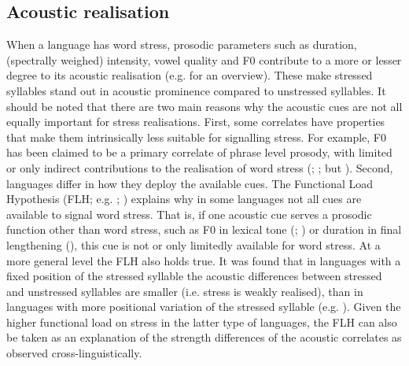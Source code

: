 \subsection{Acoustic realisation} \label{sec511}
When a language has word stress, prosodic parameters such as duration, (spectrally weighed) intensity, vowel quality and F0 contribute to a more or lesser degree to its acoustic realisation (e.g. \citealt{vanheuven_acoustic_2018} for an overview). These make stressed syllables stand out in acoustic prominence compared to unstressed syllables. It should be noted that there are two main reasons why the acoustic cues are not all equally important for stress realisations. First, some correlates have properties that make them intrinsically less suitable for signalling stress. For example, F0 has been claimed to be a primary correlate of phrase level prosody, with limited or only indirect contributions to the realisation of word stress (\citealt{gordon_disentangling_2014}; \citealt{gordon_acoustic_2017}; but \citealt{vogel_prominence_2016}). Second, languages differ in how they deploy the available cues. The Functional Load Hypothesis (FLH; e.g. \citealt{hockett_manual_1955}; \citealt{berinstein_cross-linguistic_1979}) explains why in some languages not all cues are available to signal word stress. That is, if one acoustic cue serves a prosodic function other than word stress, such as F0 in lexical tone (\citealt{potisuk_acoustic_1996}; \citealt{remijsen_lexically_2002}) or duration in final lengthening (\citealt{mcdonnell_acoustic_2016}), this cue is not or only limitedly available for word stress. At a more general level the FLH also holds true. It was found that in languages with a fixed position of the stressed syllable the acoustic differences between stressed and unstressed syllables are smaller (i.e. stress is weakly realised), than in languages with more positional variation of the stressed syllable (e.g. \citealt{dogil_phonetic_1999}). Given the higher functional load on stress in the latter type of languages, the FLH can also be taken as an explanation of the strength differences of the acoustic correlates as observed cross-linguistically.

